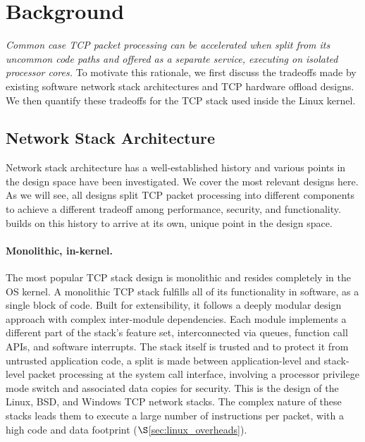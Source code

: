 \section{Background}\label{sec:background}

\emph{Common case TCP packet processing can be accelerated when split
  from its uncommon code paths and offered as a separate service,
  executing on isolated processor cores.} To motivate this rationale,
we first discuss the tradeoffs made by existing software network stack
architectures and TCP hardware offload designs. We then quantify these
tradeoffs for the TCP stack used inside the Linux kernel.

\subsection{Network Stack Architecture}

Network stack architecture has a well-established history and various
points in the design space have been investigated. We cover the most
relevant designs here. As we will see, all designs split TCP packet
processing into different components to achieve a different tradeoff
among performance, security, and functionality. \taas builds on this
history to arrive at its own, unique point in the design space.

\paragraph{Monolithic, in-kernel.} The most popular TCP stack design
is monolithic and resides completely in the OS kernel. A monolithic
TCP stack fulfills all of its functionality in software, as a single
block of code. Built for extensibility, it follows a deeply modular
design approach with complex inter-module dependencies. Each module
implements a different part of the stack's feature set, interconnected
via queues, function call APIs, and software interrupts. The stack
itself is trusted and to protect it from untrusted application code, a
split is made between application-level and stack-level packet
processing at the system call interface, involving a processor
privilege mode switch and associated data copies for security. This is
the design of the Linux, BSD, and Windows TCP network stacks. The
complex nature of these stacks leads them to execute a large number of
instructions per packet, with a high code and data footprint
($\S$\ref{sec:linux_overheads}).

